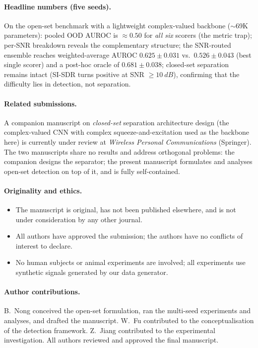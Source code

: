 \documentclass[11pt,a4paper]{article}
\begin{document}
\paragraph{Headline numbers (five seeds).}
On the open-set benchmark with a lightweight complex-valued backbone ($\sim$69K parameters): pooled OOD AUROC is $\approx 0.50$ for \emph{all six} scorers (the metric trap); per-SNR breakdown reveals the complementary structure; the SNR-routed ensemble reaches weighted-average AUROC $0.625 \pm 0.031$ vs.\ $0.526 \pm 0.043$ (best single scorer) and a post-hoc oracle of $0.681 \pm 0.038$; closed-set separation remains intact (SI-SDR turns positive at SNR $\geq \SI{10}{dB}$), confirming that the difficulty lies in detection, not separation.

\paragraph{Related submissions.}
A companion manuscript on \emph{closed-set} separation architecture design (the complex-valued CNN with complex squeeze-and-excitation used as the backbone here) is currently under review at \emph{Wireless Personal Communications} (Springer). The two manuscripts share no results and address orthogonal problems: the companion designs the separator; the present manuscript formulates and analyses open-set detection on top of it, and is fully self-contained.

\paragraph{Originality and ethics.}
\begin{itemize}
\item The manuscript is original, has not been published elsewhere, and is not under consideration by any other journal.
\item All authors have approved the submission; the authors have no conflicts of interest to declare.
\item No human subjects or animal experiments are involved; all experiments use synthetic signals generated by our data generator.
\end{itemize}

\paragraph{Author contributions.}
B.~Nong conceived the open-set formulation, ran the multi-seed experiments and analyses, and drafted the manuscript. W.~Fu contributed to the conceptualisation of the detection framework. Z.~Jiang contributed to the experimental investigation. All authors reviewed and approved the final manuscript.
\end{document}

